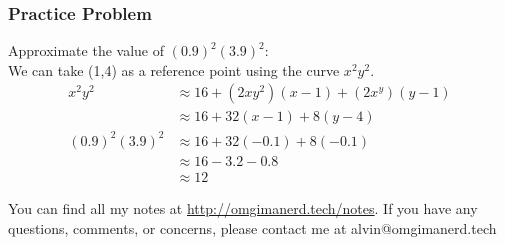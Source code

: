 \documentclass{math}
\begin{document}
\subsubsection*{Practice Problem}
Approximate the value of \( (0.9)^2(3.9)^2 \): \\
We can take (1,4) as a reference point using the curve \( x^2y^2 \).
\begin{align*}
  x^2y^2 &\approx 16+(2xy^2)(x-1)+(2x^y)(y-1) \\
  &\approx 16+32(x-1)+8(y-4) \\
  (0.9)^2(3.9)^2 &\approx 16+32(-0.1)+8(-0.1) \\
  &\approx 16-3.2-0.8 \\
  &\approx 12
\end{align*}

\begin{center}
  You can find all my notes at \url{http://omgimanerd.tech/notes}. If you have
  any questions, comments, or concerns, please contact me at
  alvin@omgimanerd.tech
\end{center}
\end{document}
